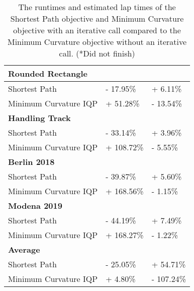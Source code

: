 \begin{table}[H]
\begin{tabular}{|lll|}
        \multicolumn{3}{|l|}{\textbf{Rounded Rectangle}}                                                                                       \\ \hline
        \multicolumn{1}{|l|}{Shortest Path}         & \multicolumn{1}{l|}{- 17.95\%}        & \multicolumn{1}{l|}{+ 6.11\%}                    \\ \hline
        \multicolumn{1}{|l|}{Minimum Curvature IQP} & \multicolumn{1}{l|}{+ 51.28\%}        & \multicolumn{1}{l|}{- 13.54\%}                   \\ \hline
        \multicolumn{3}{|l|}{\textbf{Handling Track}}                                                                                          \\ \hline
        \multicolumn{1}{|l|}{Shortest Path}         & \multicolumn{1}{l|}{- 33.14\%}        & \multicolumn{1}{l|}{+ 3.96\%}                    \\ \hline
        \multicolumn{1}{|l|}{Minimum Curvature IQP} & \multicolumn{1}{l|}{+ 108.72\%}       & \multicolumn{1}{l|}{- 5.55\%}                    \\ \hline
        \multicolumn{3}{|l|}{\textbf{Berlin 2018}}                                                                                             \\ \hline
        \multicolumn{1}{|l|}{Shortest Path}         & \multicolumn{1}{l|}{- 39.87\%}        & \multicolumn{1}{l|}{+ 5.60\%}                    \\ \hline
        \multicolumn{1}{|l|}{Minimum Curvature IQP} & \multicolumn{1}{l|}{+ 168.56\%}       & \multicolumn{1}{l|}{- 1.15\%}                    \\ \hline
        \multicolumn{3}{|l|}{\textbf{Modena 2019}}                                                                                             \\ \hline
        \multicolumn{1}{|l|}{Shortest Path}         & \multicolumn{1}{l|}{- 44.19\%}        & \multicolumn{1}{l|}{+ 7.49\%}                    \\ \hline
        \multicolumn{1}{|l|}{Minimum Curvature IQP} & \multicolumn{1}{l|}{+ 168.27\%}       & \multicolumn{1}{l|}{- 1.22\%}                    \\ \hline
        \multicolumn{3}{|l|}{\textbf{Average}}                                                                                                 \\ \hline
        \multicolumn{1}{|l|}{Shortest Path}         & \multicolumn{1}{l|}{- 25.05\%}        & \multicolumn{1}{l|}{+ 54.71\%}                   \\ \hline
        \multicolumn{1}{|l|}{Minimum Curvature IQP} & \multicolumn{1}{l|}{+ 4.80\%}         & \multicolumn{1}{l|}{- 107.24\%}                  \\ \hline
    \end{tabular}
    \caption{The runtimes and estimated lap times of the Shortest Path objective and Minimum Curvature objective with an iterative call compared to the Minimum Curvature objective without an iterative call. (*Did not finish)}
    \label{tab:Results Optimization Objectives Average}
\end{table}
